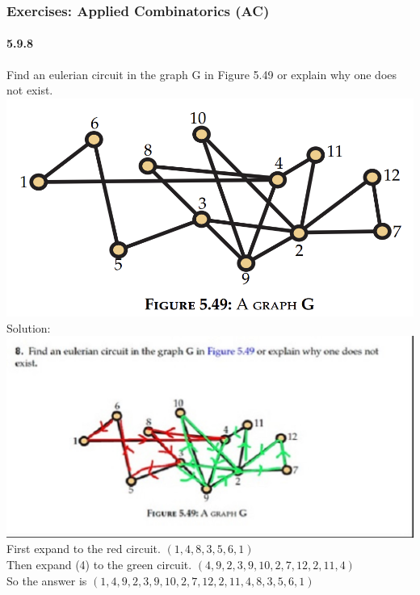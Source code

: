 \documentclass{article}
\begin{document}
\subsubsection{Exercises: Applied Combinatorics (AC)}
\paragraph{5.9.8}
Find an eulerian circuit in the graph G in Figure 5.49 or explain why one does not exist.\newline
\includegraphics{0074}\newline
Solution:\newline
\includegraphics{5.9.49}\\
First expand to the red circuit. $(1,4,8,3,5,6,1)$ \\
Then expand (4) to the green circuit. $( 4 , 9 , 2 , 3 , 9 , 10 , 2 , 7 , 12 , 2 , 11 , 4 )$\\
So the answer is $( 1 , 4 , 9 , 2 , 3 , 9 , 10 , 2 , 7 , 12 , 2 , 11 , 4 , 8 , 3 , 5 , 6 , 1 )$
\end{document}
